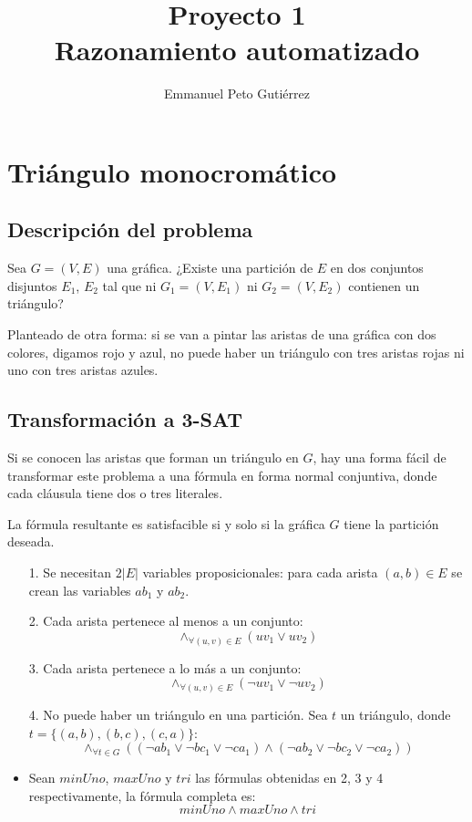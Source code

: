 \documentclass{article}
\author{Emmanuel Peto Gutiérrez}
\title{Proyecto 1\\Razonamiento automatizado}
\begin{document}
\maketitle

\section*{Triángulo monocromático}

\subsection*{Descripción del problema}

Sea $G = (V, E)$ una gráfica. ¿Existe una partición de $E$ en dos conjuntos disjuntos $E_1$, $E_2$ tal que ni $G_1 = (V, E_1)$ ni $G_2 = (V, E_2)$ contienen un triángulo?

Planteado de otra forma: si se van a pintar las aristas de una gráfica con dos colores, digamos rojo y azul, no puede haber un triángulo con tres aristas rojas ni uno con tres aristas azules.

\subsection*{Transformación a 3-SAT}

Si se conocen las aristas que forman un triángulo en $G$, hay una forma fácil de transformar este problema a una fórmula en forma normal conjuntiva, donde cada cláusula tiene dos o tres literales.

La fórmula resultante es satisfacible si y solo si la gráfica $G$ tiene la partición deseada.

\begin{itemize}
\item[1.] Se necesitan $2|E|$ variables proposicionales: para cada arista $(a,b) \in E$ se crean las variables $ab_1$ y $ab_2$.
\item[2.] Cada arista pertenece al menos a un conjunto: $$\wedge_{\forall (u,v) \in E} (uv_1 \vee uv_2)$$
\item[3.] Cada arista pertenece a lo más a un conjunto: $$\wedge_{\forall (u,v) \in E} (\neg uv_1 \vee \neg uv_2)$$
\item[4.] No puede haber un triángulo en una partición. Sea $t$ un triángulo, donde $t = \{ (a,b), (b,c), (c,a) \}$: 
$$\wedge_{\forall t \in G} ((\neg ab_1 \vee \neg bc_1 \vee \neg ca_1) \wedge (\neg ab_2 \vee \neg bc_2 \vee \neg ca_2))$$
\item Sean $minUno$, $maxUno$ y $tri$ las fórmulas obtenidas en 2, 3 y 4 respectivamente, la fórmula completa es: $$minUno \wedge maxUno \wedge tri$$
\end{itemize}
\end{document}
